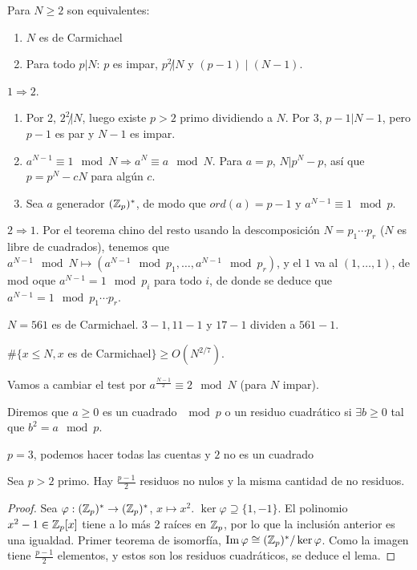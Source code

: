 \documentclass[CR.tex]{subfiles}
\begin{document}
\begin{prop}
Para $N\geq 2$ son equivalentes:
\begin{enumerate}
\item $N$ es de Carmichael
\item Para todo $p|N$: $p$ es impar, $p^2\not| N$ y $(p-1)\mid (N-1)$. 
\end{enumerate}
\end{prop}
\begin{dem}
$1\Rightarrow 2$. 
\begin{enumerate}
\item Por 2, $2^2\not| N$, luego existe $p>2$ primo dividiendo a $N$.  Por 3, $p-1|N-1$, pero $p-1$ es par y $N-1$ es impar. 
\item $a^{N-1}\equiv 1\mod N\Rightarrow a^N\equiv a\mod N$. Para $a=p$, $N| p^N-p$, así que $p=p^N-cN$ para algún $c$.
\item Sea $a$ generador $(\mathbb{Z}_p)^*$, de modo que $ord(a)=p-1$ y $a^{N-1}\equiv 1\mod p$. 
\end{enumerate}

$2\Rightarrow 1$. Por el teorema chino del resto usando la descomposición $N=p_1\cdots p_r$ ($N$ es libre de cuadrados), tenemos que $a^{N-1}\mod N\mapsto (a^{N-1}\mod p_1,\dots, a^{N-1}\mod p_r)$, y el $1$ va al $(1,\dots, 1)$, de mod oque $a^{N-1}=1\mod p_i$ para todo $i$, de donde se deduce que $a^{N-1}=1\mod p_1\cdots p_r$. 
\end{dem}

\begin{ej}
$N=561$ es de Carmichael. $3-1,11-1$ y $17-1$ dividen a $561-1$. 
\end{ej}

\begin{prop}
$\#\{x\leq N, x$ es de Carmichael$\}\geq O(N^{2/7})$.
\end{prop}

Vamos a cambiar el test por $a^{\frac{N-1}{2}}\equiv 2\mod N$ (para $N$ impar). 

\begin{defi}
Diremos que $a\geq 0$ es un cuadrado $\mod p$ o un residuo cuadrático si $\exists b\geq 0$ tal que $b^2=a\mod p$.
\end{defi}

\begin{ej}
$p=3$, podemos hacer todas las cuentas y $2$ no es un cuadrado
\end{ej}

\begin{lemma}
Sea $p>2$ primo. Hay $\frac{p-1}{2}$ residuos no nulos  y la misma cantidad de no residuos. 
\end{lemma}
\begin{proof}
Sea $\varphi:(\mathbb{Z}_p)^*\to(\mathbb{Z}_p)^*$, $x\mapsto x^2$. $\ker\varphi\supseteq \{1,-1\}$. El polinomio $x^2-1\in\mathbb{Z}_p[x]$ tiene a lo más 2 raíces en $\mathbb{Z}_p$, por lo que la inclusión anterior es una igualdad. Primer teorema de isomorfía, $\operatorname{Im}\varphi\cong (\mathbb{Z}_p)^*/\ker\varphi$. Como la imagen tiene $\frac{p-1}{2}$ elementos, y estos son los residuos cuadráticos, se deduce el lema. 
\end{proof}
\end{document}
